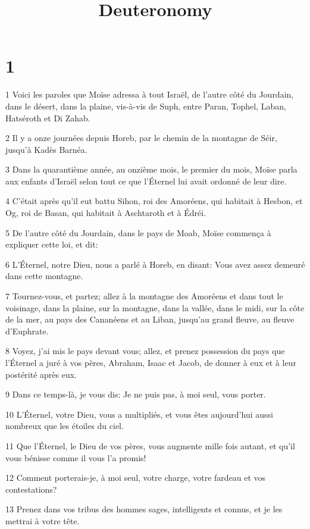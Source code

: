 

\title{Deuteronomy}


\chapter{1}

\par 1 Voici les paroles que Moïse adressa à tout Israël, de l'autre côté du Jourdain, dans le désert, dans la plaine, vis-à-vis de Suph, entre Paran, Tophel, Laban, Hatséroth et Di Zahab.
\par 2 Il y a onze journées depuis Horeb, par le chemin de la montagne de Séir, jusqu'à Kadès Barnéa.
\par 3 Dans la quarantième année, au onzième mois, le premier du mois, Moïse parla aux enfants d'Israël selon tout ce que l'Éternel lui avait ordonné de leur dire.
\par 4 C'était après qu'il eut battu Sihon, roi des Amoréens, qui habitait à Hesbon, et Og, roi de Basan, qui habitait à Aschtaroth et à Édréi.
\par 5 De l'autre côté du Jourdain, dans le pays de Moab, Moïse commença à expliquer cette loi, et dit:
\par 6 L'Éternel, notre Dieu, nous a parlé à Horeb, en disant: Vous avez assez demeuré dans cette montagne.
\par 7 Tournez-vous, et partez; allez à la montagne des Amoréens et dans tout le voisinage, dans la plaine, sur la montagne, dans la vallée, dans le midi, sur la côte de la mer, au pays des Cananéens et au Liban, jusqu'au grand fleuve, au fleuve d'Euphrate.
\par 8 Voyez, j'ai mis le pays devant vous; allez, et prenez possession du pays que l'Éternel a juré à vos pères, Abraham, Isaac et Jacob, de donner à eux et à leur postérité après eux.
\par 9 Dans ce temps-là, je vous dis: Je ne puis pas, à moi seul, vous porter.
\par 10 L'Éternel, votre Dieu, vous a multipliés, et vous êtes aujourd'hui aussi nombreux que les étoiles du ciel.
\par 11 Que l'Éternel, le Dieu de vos pères, vous augmente mille fois autant, et qu'il vous bénisse comme il vous l'a promis!
\par 12 Comment porterais-je, à moi seul, votre charge, votre fardeau et vos contestations?
\par 13 Prenez dans vos tribus des hommes sages, intelligents et connus, et je les mettrai à votre tête.
